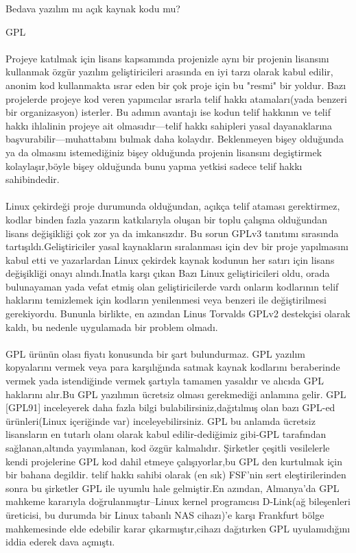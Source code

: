 \documentclass[10pt,a5paper]{book}
\begin{document}
\begin{section}{Bedava yazılım mı açık kaynak kodu mu?}
\begin{subsection}{GPL}
\paragraph{}{Projeye katılmak için  lisans kapsamında projenizle aynı bir projenin lisansını kullanmak özgür yazılım geliştiricileri arasında en iyi tarzı olarak kabul edilir, anonim kod  kullanmakta ısrar eden  bir çok proje için bu  "resmi" bir yoldur. Bazı projelerde projeye kod veren yapımcılar ısrarla telif hakkı atamaları(yada benzeri bir organizasyon) isterler. Bu adımın avantajı ise kodun telif hakkının ve telif hakkı ihlalinin projeye ait olmasıdır—telif hakkı sahipleri yasal dayanaklarına başvurabilir—muhattabını bulmak daha kolaydır. Beklenmeyen bişey olduğunda ya da olmasını istemediğiniz bişey olduğunda projenin lisansını degiştirmek kolaylaşır,böyle bişey olduğunda bunu yapma yetkisi sadece telif hakkı sahibindedir.}
\paragraph{}{Linux çekirdeği proje durumunda olduğundan, açıkça telif ataması gerektirmez, kodlar binden fazla yazarın katkılarıyla oluşan bir toplu çalışma  olduğundan lisans değişikliği çok zor ya da imkansızdır. Bu sorun GPLv3 tanıtımı sırasında tartışıldı.Geliştiriciler yasal kaynakların sıralanması için dev bir proje yapılmasını kabul etti ve yazarlardan Linux çekirdek kaynak kodunun her satırı için lisans değişikliği onayı alındı.Inatla karşı çıkan Bazı Linux geliştiricileri oldu, orada bulunayaman yada vefat etmiş olan geliştiricilerde vardı onların kodlarının telif haklarını temizlemek için kodların yenilenmesi veya benzeri ile değiştirilmesi gerekiyordu. Bununla birlikte, en azından Linus Torvalds GPLv2  destekçisi olarak kaldı, bu nedenle uygulamada bir problem olmadı.}
\paragraph{}{GPL ürünün olası fiyatı konusunda bir şart bulundurmaz. GPL yazılım kopyalarını vermek veya para karşılığında satmak kaynak kodlarını beraberinde vermek yada istendiğinde vermek şartıyla tamamen yasaldır ve alıcıda GPL haklarını alır.Bu GPL yazılımın ücretsiz olması gerekmediği anlamına gelir. GPL [GPL91] inceleyerek daha fazla bilgi bulabilirsiniz,dağıtılmış olan bazı  GPL-ed ürünleri(Linux içeriğinde var) inceleyebilirsiniz. GPL  bu anlamda ücretsiz lisansların en tutarlı olanı olarak kabul edilir-dediğimiz gibi-GPL tarafından sağlanan,altında yayımlanan, kod  özgür kalmalıdır. Şirketler çeşitli vesilelerle kendi projelerine GPL kod dahil etmeye çalışıyorlar,bu GPL den kurtulmak için bir bahana degildir. telif hakkı sahibi olarak (en sık) FSF'nin sert eleştirilerinden sonra bu şirketler GPL ile uyumlu hale gelmiştir.En azından, Almanya'da GPL mahkeme kararıyla doğrulanmıştır--Linux kernel programcısı D-Link(ağ bileşenleri üreticisi, bu durumda bir Linux tabanlı NAS cihazı)'e karşı Frankfurt bölge mahkemesinde elde edebilir karar çıkarmıştır,cihazı dağıtırken GPL uyulamıdığını iddia ederek dava açmıştı.}

\end{subsection}
\end{section}
\end{document}
